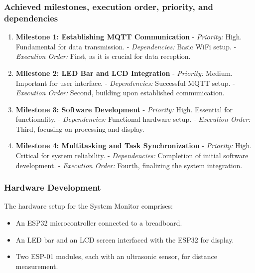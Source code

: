 \subsubsection{Achieved milestones, execution order, priority, and dependencies}
\begin{enumerate}
    \item \textbf{Milestone 1: Establishing MQTT Communication}
       - \textit{Priority:} High. Fundamental for data transmission.
       - \textit{Dependencies:} Basic WiFi setup.
       - \textit{Execution Order:} First, as it is crucial for data reception.

    \item \textbf{Milestone 2: LED Bar and LCD Integration}
       - \textit{Priority:} Medium. Important for user interface.
       - \textit{Dependencies:} Successful MQTT setup.
       - \textit{Execution Order:} Second, building upon established communication.

    \item \textbf{Milestone 3: Software Development}
       - \textit{Priority:} High. Essential for functionality.
       - \textit{Dependencies:} Functional hardware setup.
       - \textit{Execution Order:} Third, focusing on processing and display.

    \item \textbf{Milestone 4: Multitasking and Task Synchronization}
       - \textit{Priority:} High. Critical for system reliability.
       - \textit{Dependencies:} Completion of initial software development.
       - \textit{Execution Order:} Fourth, finalizing the system integration.
\end{enumerate}

\subsubsection{Hardware Development}
The hardware setup for the System Monitor comprises:
\begin{itemize}
    \item An ESP32 microcontroller connected to a breadboard.
    \item An LED bar and an LCD screen interfaced with the ESP32 for display.
    \item Two ESP-01 modules, each with an ultrasonic sensor, for distance measurement.
\end{itemize}

